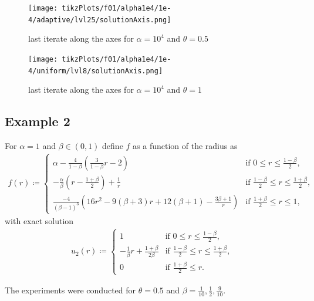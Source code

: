 \documentclass[draft=false,twoside,12pt]{scrreprt}
\begin{document}
\vspace{-\parskip}
\begin{minipage}[t]{0.45\textwidth}
  \begin{figure}[H]
	  \centering
		\texttt{[image: tikzPlots/f01/alpha1e4/1e-4/adaptive/lvl25/solutionAxis.png]} 
    \caption{last iterate along the axes for $\alpha=10^4$ and $\theta = 0.5$}
  \end{figure}
\end{minipage}
\hfill
\vline
\hfill
\begin{minipage}[t]{0.45\textwidth}
  \begin{figure}[H]
	  \centering
		\texttt{[image: tikzPlots/f01/alpha1e4/1e-4/uniform/lvl8/solutionAxis.png]} 
    \caption{last iterate along the axes for $\alpha=10^4$ and $\theta = 1$}
  \end{figure}
\end{minipage}

\subsection{Example 2}
For $\alpha=1$ and $\beta\in(0,1)$ define $f$ as a function of the radius as
\begin{align*}
  f(r)\coloneqq 
  \begin{cases}
    \alpha - \frac{4}{1-\beta}\left(\frac{3}{1-\beta}r - 2\right) &
    \text{if } 0\leq r\leq\frac{1-\beta}{2},\\
    -\frac{\alpha}{\beta}\left( r-\frac{1+\beta}{2} \right) +\frac{1}{r} & 
    \text{if } \frac{1-\beta}{2}\leq r\leq \frac{1+\beta}{2},\\
    \frac{-4}{(\beta-1)^3}
    \left( 16r^2 -9(\beta+3)r + 12(\beta+1) - \frac{3\beta+1}{r}\right) & 
    \text{if } \frac{1+\beta}{2}\leq r\leq 1,
  \end{cases}
\end{align*}
with exact solution
\begin{align*}
  u_2(r)\coloneqq 
  \begin{cases}
    1 & \text{if } 0\leq r\leq\frac{1-\beta}{2},\\
    -\frac{1}{\beta}r + \frac{1+\beta}{2\beta} & 
    \text{if } \frac{1-\beta}{2}\leq r\leq \frac{1+\beta}{2},\\
    0 & \text{if } \frac{1+\beta}{2}\leq r.
  \end{cases}
\end{align*}

The experiments were conducted for $\theta = 0.5$ and 
$\beta = \frac{1}{10}, \frac{1}{2},
\frac{9}{10}$.
\end{document}
